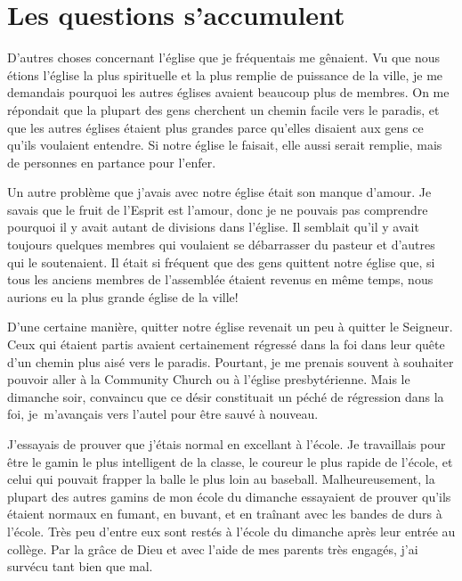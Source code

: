 \section{Les questions s'accumulent}

D'autres choses concernant l'église que je fréquentais me gênaient.
 Vu que nous étions l'église la plus spirituelle et la plus remplie
 de puissance de la ville,
 je me demandais pourquoi les autres églises avaient beaucoup plus
 de membres. On me répondait que la plupart des
 gens cherchent un chemin facile vers le paradis, et que les autres églises
 étaient plus grandes parce qu'elles disaient aux gens ce qu'ils voulaient
 entendre. Si notre église le faisait, elle aussi serait remplie,
 mais de personnes en partance pour l'enfer.

Un autre problème que j'avais avec notre église était son manque d'amour. Je
 savais que le fruit de l'Esprit est l'amour,
 donc je ne pouvais pas comprendre
 pourquoi il y avait autant de divisions dans l'église. Il semblait
 qu'il y avait toujours quelques membres qui voulaient se débarrasser du pasteur et
 d'autres qui le soutenaient. Il était si fréquent que des gens quittent notre église que,
 si tous les anciens membres de l'assemblée étaient revenus en même temps, nous aurions
 eu la plus grande église de la ville!

D'une certaine manière, quitter notre église revenait un peu à quitter le
 Seigneur. Ceux qui étaient partis avaient certainement régressé dans la foi dans leur quête
 d'un chemin plus aisé vers le paradis. Pourtant, je me prenais souvent à
 souhaiter pouvoir aller à la \Og Community Church \Fg{} ou à l'église presbytérienne. Mais
 le dimanche soir, convaincu que ce désir constituait un péché de régression dans la foi,
 je~m'avançais vers l'autel pour être \Og sauvé \Fg{} à nouveau.
 
J'essayais de prouver que j'étais normal en excellant à l'école. Je travaillais
 pour être le gamin le plus intelligent de la classe, le coureur le plus rapide de
 l'école, et celui qui pouvait frapper la balle le plus loin au baseball.
 Malheureusement, la plupart des autres gamins de mon école du dimanche
 essayaient de prouver qu'ils étaient normaux en fumant, en buvant, et en
 traînant avec les bandes de durs à l'école. Très peu d'entre eux sont restés à
 l'école du dimanche après leur entrée au collège. Par la grâce de Dieu et avec
 l'aide de mes parents très engagés, j'ai survécu tant bien que mal.

